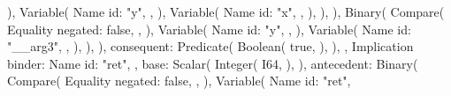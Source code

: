 \documentclass[
  oneside,
  english,
  coorientadorbanca,
  noabntexcite
]{ufsc-thesis-rn46-2019}
\begin{document}
\begin{rustcode}
{{{{{                                            ),
                                            Variable(
                                                Name {
                                                    id: "y",
                                                },
                                            ),
                                            Variable(
                                                Name {
                                                    id: "x",
                                                },
                                            ),
                                        ),
                                    ),
                                    Binary(
                                        Compare(
                                            Equality {
                                                negated: false,
                                            },
                                        ),
                                        Variable(
                                            Name {
                                                id: "y",
                                            },
                                        ),
                                        Variable(
                                            Name {
                                                id: "__arg3",
                                            },
                                        ),
                                    ),
                                ),
                                consequent: Predicate(
                                    Boolean(
                                        true,
                                    ),
                                ),
                            },
                            Implication {
                                binder: Name {
                                    id: "ret",
                                },
                                base: Scalar(
                                    Integer(
                                        I64,
                                    ),
                                ),
                                antecedent: Binary(
                                    Compare(
                                        Equality {
                                            negated: false,
                                        },
                                    ),
                                    Variable(
                                        Name {
                                            id: "ret",
}}}}}}
\end{rustcode}
\end{document}
